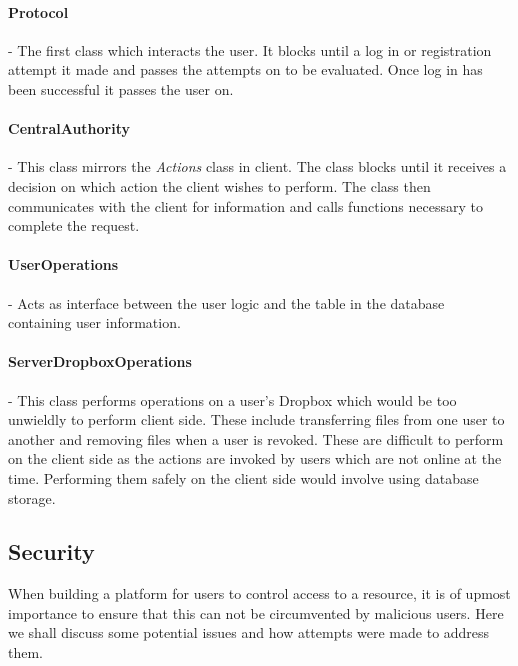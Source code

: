 \documentclass[12pt, titlepage]{article}
\begin{document}
\paragraph*{Protocol} - The first class which interacts the user. It blocks until a log in or registration attempt it made and passes the attempts on to be evaluated. Once log in has been successful it passes the user on.

\paragraph*{CentralAuthority} - This class mirrors the \textit{Actions} class in client. The class blocks until it receives a decision on which action the client wishes to perform. The class then communicates with the client for information and calls functions necessary to complete the request.
\paragraph*{UserOperations} - Acts as interface between the user logic and the table in the database containing user information.

\paragraph*{ServerDropboxOperations} - This class performs operations on a user's Dropbox which would be too unwieldly to perform client side. These include transferring files from one user to another and removing files when a user is revoked. These are difficult to perform on the client side as the actions are invoked by users which are not online at the time. Performing them safely on the client side would involve using database storage.



\subsection{Security}
When building a platform for users to control access to a resource, it is of upmost importance to ensure that this can not be circumvented by malicious users. Here we shall discuss some potential issues and how attempts were made to address them.
\end{document}
